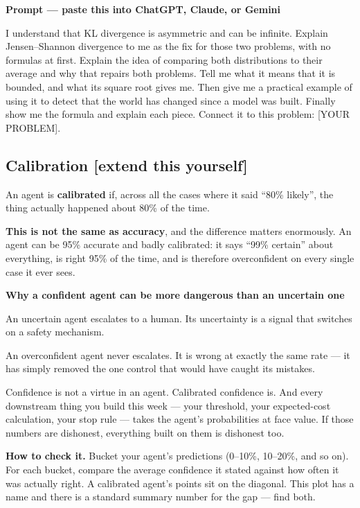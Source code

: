 \documentclass[11pt,a4paper]{article}
\newcommand{\keyword}[1]{\textbf{#1}}
\newcommand{\boxtitle}[1]{{\bfseries #1}\par\vspace{2pt}}
\newcommand{\extend}{\hfill{\footnotesize\sffamily\color{sbaccent}[extend this yourself]}}
\newenvironment{learnprompt}
  {\begin{sbbox}\boxtitle{Prompt --- paste this into ChatGPT, Claude, or Gemini}%
   \ttfamily\small\raggedright}
  {\end{sbbox}}
\begin{document}
\begin{learnprompt}
I understand that KL divergence is asymmetric and can be infinite. Explain Jensen--Shannon
divergence to me as the fix for those two problems, with no formulas at first. Explain the idea
of comparing both distributions to their average and why that repairs both problems. Tell me what
it means that it is bounded, and what its square root gives me. Then give me a practical example
of using it to detect that the world has changed since a model was built. Finally show me the
formula and explain each piece. Connect it to this problem: [YOUR PROBLEM].
\end{learnprompt}

\subsection{Calibration \extend}

An agent is \keyword{calibrated} if, across all the cases where it said ``80\% likely'', the
thing actually happened about 80\% of the time.

\textbf{This is not the same as accuracy}, and the difference matters enormously. An agent can be
95\% accurate and badly calibrated: it says ``99\% certain'' about everything, is right 95\% of
the time, and is therefore overconfident on every single case it ever sees.

\begin{sbbox}
\boxtitle{Why a confident agent can be more dangerous than an uncertain one}
An uncertain agent escalates to a human. Its uncertainty is a signal that switches on a safety
mechanism.

An overconfident agent never escalates. It is wrong at exactly the same rate --- it has simply
removed the one control that would have caught its mistakes.

Confidence is not a virtue in an agent. Calibrated confidence is. And every downstream thing you
build this week --- your threshold, your expected-cost calculation, your stop rule --- takes the
agent's probabilities at face value. If those numbers are dishonest, everything built on them is
dishonest too.
\end{sbbox}

\textbf{How to check it.} Bucket your agent's predictions (0--10\%, 10--20\%, and so on). For each
bucket, compare the average confidence it stated against how often it was actually right. A
calibrated agent's points sit on the diagonal. This plot has a name and there is a standard
summary number for the gap --- find both.
\end{document}
